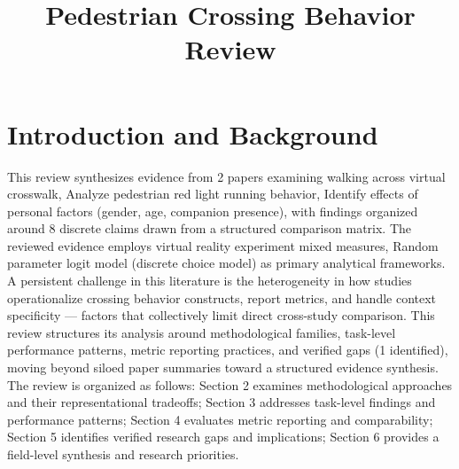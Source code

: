 \documentclass{article}
\title{Pedestrian Crossing Behavior Review}
\begin{document}
\maketitle
\section{Introduction and Background}
This review synthesizes evidence from 2 papers examining walking across virtual crosswalk, Analyze pedestrian red light running behavior, Identify effects of personal factors (gender, age, companion presence), with findings organized around 8 discrete claims drawn from a structured comparison matrix. The reviewed evidence employs virtual reality experiment mixed measures, Random parameter logit model (discrete choice model) as primary analytical frameworks. A persistent challenge in this literature is the heterogeneity in how studies operationalize crossing behavior constructs, report metrics, and handle context specificity — factors that collectively limit direct cross-study comparison. This review structures its analysis around methodological families, task-level performance patterns, metric reporting practices, and verified gaps (1 identified), moving beyond siloed paper summaries toward a structured evidence synthesis. The review is organized as follows: Section 2 examines methodological approaches and their representational tradeoffs; Section 3 addresses task-level findings and performance patterns; Section 4 evaluates metric reporting and comparability; Section 5 identifies verified research gaps and implications; Section 6 provides a field-level synthesis and research priorities.
\end{document}
